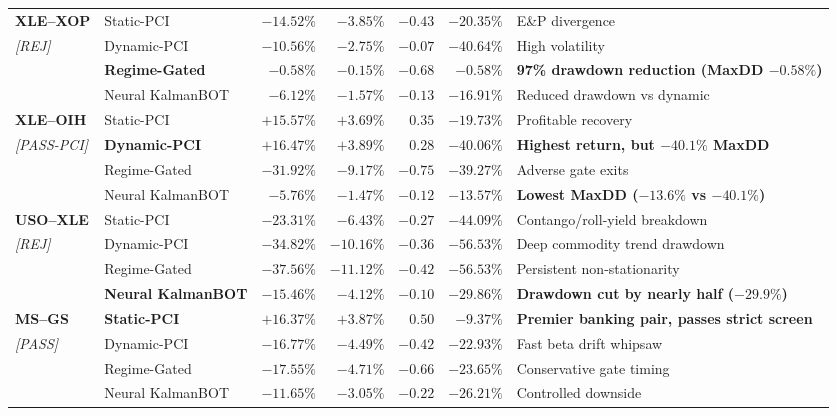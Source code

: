 \documentclass[11pt, a4paper]{article}
\begin{document}
\begin{center}
\begin{longtable}{llrrrrp{4.8cm}}
\midrule
\textbf{XLE--XOP} & Static-PCI & $-14.52\%$ & $-3.85\%$ & $-0.43$ & $-20.35\%$ & E\&P divergence \\
\small\textit{[REJ]} & Dynamic-PCI & $-10.56\%$ & $-2.75\%$ & $-0.07$ & $-40.64\%$ & High volatility \\
 & \textbf{Regime-Gated} & $\mathbf{-0.58\%}$ & $\mathbf{-0.15\%}$ & $\mathbf{-0.68}$ & $\mathbf{-0.58\%}$ & \textbf{97\% drawdown reduction (MaxDD $-0.58\%$)} \\
 & Neural KalmanBOT & $-6.12\%$ & $-1.57\%$ & $-0.13$ & $-16.91\%$ & Reduced drawdown vs dynamic \\
\midrule
\textbf{XLE--OIH} & Static-PCI & $+15.57\%$ & $+3.69\%$ & $0.35$ & $-19.73\%$ & Profitable recovery \\
\small\textit{[PASS-PCI]} & \textbf{Dynamic-PCI} & $\mathbf{+16.47\%}$ & $\mathbf{+3.89\%}$ & $\mathbf{0.28}$ & $\mathbf{-40.06\%}$ & \textbf{Highest return, but $-40.1\%$ MaxDD} \\
 & Regime-Gated & $-31.92\%$ & $-9.17\%$ & $-0.75$ & $-39.27\%$ & Adverse gate exits \\
 & Neural KalmanBOT & $-5.76\%$ & $-1.47\%$ & $-0.12$ & $\mathbf{-13.57\%}$ & \textbf{Lowest MaxDD ($-13.6\%$ vs $-40.1\%$)} \\
\midrule
\textbf{USO--XLE} & Static-PCI & $-23.31\%$ & $-6.43\%$ & $-0.27$ & $-44.09\%$ & Contango/roll-yield breakdown \\
\small\textit{[REJ]} & Dynamic-PCI & $-34.82\%$ & $-10.16\%$ & $-0.36$ & $-56.53\%$ & Deep commodity trend drawdown \\
 & Regime-Gated & $-37.56\%$ & $-11.12\%$ & $-0.42$ & $-56.53\%$ & Persistent non-stationarity \\
 & \textbf{Neural KalmanBOT} & $\mathbf{-15.46\%}$ & $\mathbf{-4.12\%}$ & $\mathbf{-0.10}$ & $\mathbf{-29.86\%}$ & \textbf{Drawdown cut by nearly half ($-29.9\%$)} \\
\midrule
\textbf{MS--GS} & \textbf{Static-PCI} & $\mathbf{+16.37\%}$ & $\mathbf{+3.87\%}$ & $\mathbf{0.50}$ & $\mathbf{-9.37\%}$ & \textbf{Premier banking pair, passes strict screen} \\
\small\textit{[PASS]} & Dynamic-PCI & $-16.77\%$ & $-4.49\%$ & $-0.42$ & $-22.93\%$ & Fast beta drift whipsaw \\
 & Regime-Gated & $-17.55\%$ & $-4.71\%$ & $-0.66$ & $-23.65\%$ & Conservative gate timing \\
 & Neural KalmanBOT & $-11.65\%$ & $-3.05\%$ & $-0.22$ & $-26.21\%$ & Controlled downside \\

\end{longtable}
\end{center}
\end{document}

